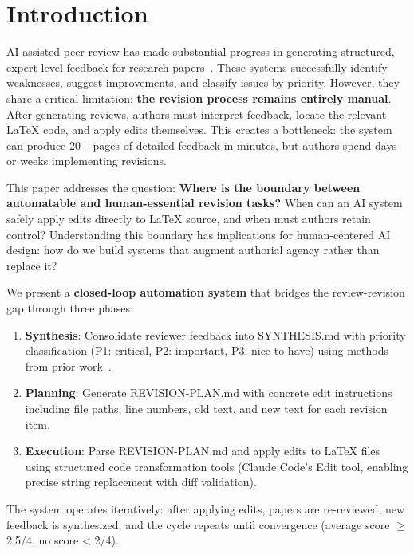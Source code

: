 \section{Introduction}

AI-assisted peer review has made substantial progress in generating structured, expert-level feedback for research papers~\cite{dellalibera2026review,damour2023simulated}. These systems successfully identify weaknesses, suggest improvements, and classify issues by priority. However, they share a critical limitation: \textbf{the revision process remains entirely manual}. After generating reviews, authors must interpret feedback, locate the relevant LaTeX code, and apply edits themselves. This creates a bottleneck: the system can produce 20+ pages of detailed feedback in minutes, but authors spend days or weeks implementing revisions.

This paper addresses the question: \textbf{Where is the boundary between automatable and human-essential revision tasks?} When can an AI system safely apply edits directly to LaTeX source, and when must authors retain control? Understanding this boundary has implications for human-centered AI design: how do we build systems that augment authorial agency rather than replace it?

We present a \textbf{closed-loop automation system} that bridges the review-revision gap through three phases:

\begin{enumerate}
\item \textbf{Synthesis}: Consolidate reviewer feedback into SYNTHESIS.md with priority classification (P1: critical, P2: important, P3: nice-to-have) using methods from prior work~\cite{dellalibera2026synthesis}.

\item \textbf{Planning}: Generate REVISION-PLAN.md with concrete edit instructions including file paths, line numbers, old text, and new text for each revision item.

\item \textbf{Execution}: Parse REVISION-PLAN.md and apply edits to LaTeX files using structured code transformation tools (Claude Code's Edit tool, enabling precise string replacement with diff validation).
\end{enumerate}

The system operates iteratively: after applying edits, papers are re-reviewed, new feedback is synthesized, and the cycle repeats until convergence (average score $\geq$ 2.5/4, no score < 2/4).

